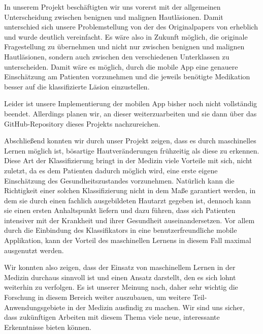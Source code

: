 In unserem Projekt beschäftigten wir uns vorerst mit der allgemeinen Unterscheidung zwischen benignen und malignen Hautläsionen. Damit unterschied sich unsere Problemstellung von der des Originalpapers von \citet{esteva2017dermatologist} erheblich und wurde deutlich vereinfacht. Es wäre also in Zukunft möglich, die originale Fragestellung zu übernehmen und nicht nur zwischen benignen und malignen Hautläsionen, sondern auch zwischen den verschiedenen Unterklassen zu unterscheiden. Damit wäre es möglich, durch die mobile App eine genauere Einschätzung am Patienten vorzunehmen und die jeweils benötigte Medikation besser auf die klassifizierte Läsion einzustellen.

Leider ist unsere Implementierung der mobilen App bisher noch nicht vollständig beendet. Allerdings planen wir, an dieser weiterzuarbeiten und sie dann über das GitHub-Repository dieses Projekts nachzureichen.  

Abschließend konnten wir durch unser Projekt zeigen, dass es durch maschinelles Lernen möglich ist, bösartige Hautveränderungen frühzeitig als diese zu erkennen. Diese Art der Klassifizierung bringt in der Medizin viele Vorteile mit sich, nicht zuletzt, da es dem Patienten dadurch möglich wird, eine erste eigene Einschätzung des Gesundheitszustandes vorzunehmen. Natürlich kann die Richtigkeit einer solchen Klassifizierung nicht in dem Maße garantiert werden, in dem sie durch einen fachlich ausgebildeten Hautarzt gegeben ist, dennoch kann sie einen ersten Anhaltspunkt liefern und dazu führen, dass sich Patienten intensiver mit der Krankheit und ihrer Gesundheit auseinandersetzen. Vor allem durch die Einbindung des Klassifikators in eine benutzerfreundliche mobile Applikation, kann der Vorteil des maschinellen Lernens in diesem Fall maximal ausgenutzt werden.

Wir konnten also zeigen, dass der Einsatz von maschinellem Lernen in der Medizin durchaus sinnvoll ist und einen Ansatz darstellt, den es sich lohnt weiterhin zu verfolgen. Es ist unserer Meinung nach, daher sehr wichtig die Forschung in diesem Bereich weiter auszubauen, um weitere Teil-Anwendungsgebiete in der Medizin ausfindig zu machen. Wir sind uns sicher, dass zukünftigen Arbeiten mit diesem Thema viele neue, interessante Erkenntnisse bieten können.    